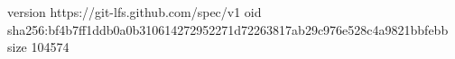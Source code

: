 version https://git-lfs.github.com/spec/v1
oid sha256:bf4b7ff1ddb0a0b310614272952271d72263817ab29c976e528c4a9821bbfebb
size 104574
